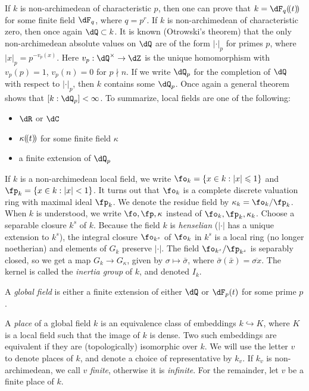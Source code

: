 If $k$ is non-archimedean of characteristic $p$, then one can prove that 
$k=\dF_q\lau t$ for some finite field $\dF_q$, where $q=p^r$. If $k$ is 
non-archimedean of characteristic zero, then once again $\dQ\subset k$. It is 
known (Otrowski's theorem) that the only non-archimedean absolute values on 
$\dQ$ are of the form $|\cdot|_p$ for primes $p$, where $|x|_p=p^{-v_p(x)}$. 
Here $v_p:\dQ^\times \to \dZ$ is the unique homomorphism with 
$v_p(p)=1$, $v_p(n)=0$ for $p\nmid n$. If we write $\dQ_p$ for the completion 
of $\dQ$ with respect to $|\cdot|_p$, then $k$ contains some $\dQ_p$. Once 
again a general theorem shows that $[k:\dQ_p]<\infty$. To summarize, local 
fields are one of the following:
\begin{itemize}
  \item $\dR$ or $\dC$
  \item $\kappa(\!({t})\!)$ for some finite field $\kappa$
  \item a finite extension of $\dQ_p$
\end{itemize}

If $k$ is a non-archimedean local field, we write 
$\fo_k=\{x\in k:|x|\leqslant 1\}$ and $\fp_k = \{x\in k:|x|<1\}$. It turns 
out that $\fo_k$ is a complete discrete valuation ring with maximal ideal 
$\fp_k$. We denote the residue field by $\kappa_k=\fo_k/\fp_k$. When $k$ is 
understood, we write $\fo,\fp,\kappa$ instead of $\fo_k,\fp_k,\kappa_k$. 
Choose a separable closure $k^s$ of $k$. Because the field $k$ is 
\emph{henselian} ($|\cdot|$ has a unique extension to $k^s$), the integral 
closure $\fo_{k^s}$ of $\fo_k$ in $k^s$ is a local ring (no longer noetherian) 
and elements of $G_k$ preserve $|\cdot|$. The field 
$\fo_{k^s}/\fp_{k^s}$ is separably closed, so we get a map 
$G_k\to G_\kappa$, given by $\sigma\mapsto \bar\sigma$, where 
$\bar\sigma(\bar x)=\overline{\sigma x}$. The kernel is called the 
\emph{inertia group} of $k$, and denoted $I_k$. 

\begin{definition}
A \emph{global field} is either a finite extension of either $\dQ$ or 
$\dF_p(t)$ for some prime $p$. 
\end{definition}
A \emph{place} of a global 
field $k$ is an equivalence class of embeddings $k\hookrightarrow K$, where 
$K$ is a local field such that the image of $k$ is dense. Two such 
embeddings are equivalent if they are (topologically) isomorphic over $k$. 
We will use the letter $v$ to denote places of $k$, and denote a choice of 
representative by $k_v$. If $k_v$ is non-archimedean, we call $v$ 
\emph{finite}, otherwise it is \emph{infinite}. For the remainder, let $v$ be 
a finite place of $k$. 

